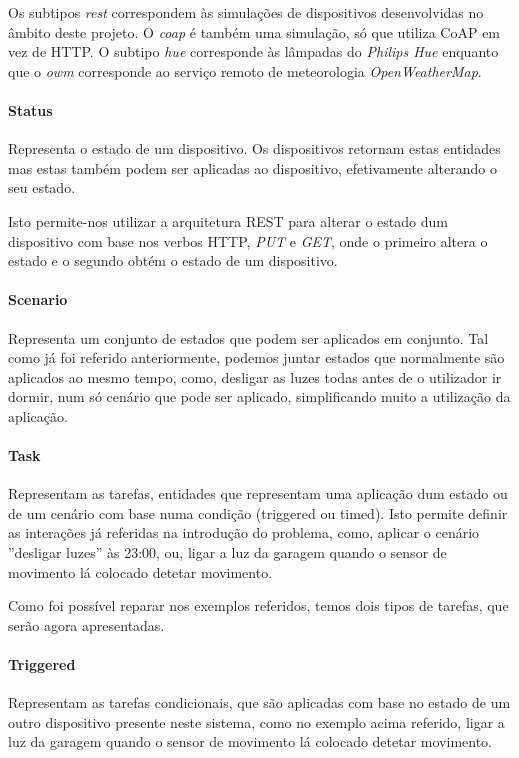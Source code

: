 Os subtipos \textit{rest} correspondem às simulações de dispositivos desenvolvidas no âmbito deste projeto. O \textit{coap} é também uma simulação, só que utiliza CoAP em vez de HTTP. O subtipo \textit{hue} corresponde às lâmpadas do \textit{Philips Hue} enquanto que o \textit{owm} corresponde ao serviço remoto de meteorologia \textit{OpenWeatherMap}.

\paragraph*{Status}
Representa o estado de um dispositivo. Os dispositivos retornam estas entidades mas estas também podem ser aplicadas ao dispositivo, efetivamente alterando o seu estado.

Isto permite-nos utilizar a arquitetura REST para alterar o estado dum dispositivo com base nos verbos HTTP, \textit{PUT} e \textit{GET}, onde o primeiro altera o estado e o segundo obtém o estado de um dispositivo.

\paragraph*{Scenario} 
Representa um conjunto de estados que podem ser aplicados em conjunto. Tal como já foi referido anteriormente, podemos juntar estados que normalmente são aplicados ao mesmo tempo, como, desligar as luzes todas antes de o utilizador ir dormir, num só cenário que pode ser aplicado, simplificando muito a utilização da aplicação.

\paragraph*{Task}
Representam as tarefas, entidades que representam uma aplicação dum estado ou de um cenário com base numa condição (triggered ou timed). Isto permite definir as interações já referidas na introdução do problema, como, aplicar o cenário ''desligar luzes'' às 23:00, ou, ligar a luz da garagem quando o sensor de movimento lá colocado detetar movimento.

Como foi possível reparar nos exemplos referidos, temos dois tipos de tarefas, que serão agora apresentadas.

\paragraph*{Triggered} 
Representam as tarefas condicionais, que são aplicadas com base no estado de um outro dispositivo presente neste sistema, como no exemplo acima referido, ligar a luz da garagem quando o sensor de movimento lá colocado detetar movimento.

